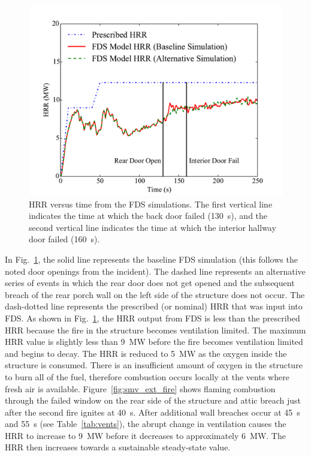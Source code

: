 \documentclass[12pt,oneside]{book}
\begin{document}
\begin{figure}[!ht]
\centering
\includegraphics[width=.80\textwidth]{../Figures/Chicago_Fire_HRR}
\caption[HRR versus time from the FDS simulations.]{HRR versus time from the FDS simulations. The first vertical line indicates the time at which the back door failed (130~s), and the second vertical line indicates the time at which the interior hallway door failed (160~s).}
\label{fig:hrr}
\end{figure}

In Fig.~\ref{fig:hrr}, the solid line represents the baseline FDS simulation (this follows the noted door openings from the incident). The dashed line represents an alternative series of events in which the rear door does not get opened and the subsequent breach of the rear porch wall on the left side of the structure does not occur. The dash-dotted line represents the prescribed (or nominal) HRR that was input into FDS. As shown in Fig.~\ref{fig:hrr}, the HRR output from FDS is less than the prescribed HRR because the fire in the structure becomes ventilation limited. The maximum HRR value is slightly less than 9~MW before the fire becomes ventilation limited and begins to decay. The HRR is reduced to 5~MW as the oxygen inside the structure is consumed. There is an insufficient amount of oxygen in the structure to burn all of the fuel, therefore combustion occurs locally at the vents where fresh air is available. Figure~\ref{fig:smv_ext_fire} shows flaming combustion through the failed window on the rear side of the structure and attic breach just after the second fire ignites at 40~s. After additional wall breaches occur at 45~s and 55~s (see Table~\ref{tab:vents}), the abrupt change in ventilation causes the HRR to increase to 9~MW before it decreases to approximately 6~MW. The HRR then increases towards a sustainable steady-state value.
\end{document}
